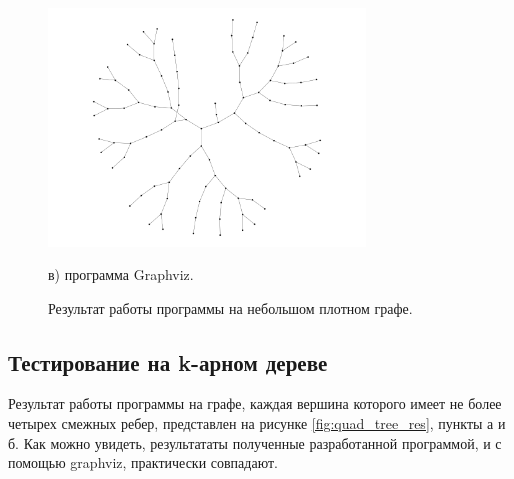 \documentclass[14pt, russian]{scrartcl}
\begin{document}
\begin{figure}[H]
\begin{minipage}[t]{.55\textwidth}
\includegraphics[width=0.75\textwidth]{./imgs/bin_tree_gv.png}
  \caption*{в) программа Graphviz.}
  \end{minipage}
\caption{Результат работы программы на небольшом плотном графе.}
\label{fig:bin_tree_res}
\end{figure}

\subsection{Тестирование на k-арном дереве}

Результат работы программы на графе, каждая вершина которого имеет не более четырех смежных ребер, представлен на рисунке \ref{fig:quad_tree_res}, пункты а и б. Как можно увидеть, результататы полученные разработанной программой, и с помощью graphviz, практически совпадают.
\end{document}

